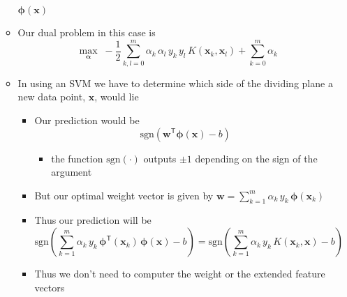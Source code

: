 \documentclass[11pt]{article}
\newcommand{\tr}{\textsf{T}}
\begin{document}
\begin{itemize}
\begin{itemize}
\(\bm{\phi}(\bm{x})\)
\item Our dual problem in this case is
$$ \max_{\bm{\alpha}}\;- \frac{1}{2} \sum_{k,l=0}^m
        \alpha_k\,\alpha_l \,
          y_k\,y_l\, K(\bm{x}_k,\bm{x}_l) +
           \sum_{k=0}^m \alpha_k$$
\item In using an SVM we have to determine which side of the dividing
plane a new data point, \(\bm{x}\), would lie
\begin{itemize}
\item Our prediction would be
$$ \mathrm{sgn}\!\left(\bm{w}^\tr \bm{\phi}(\bm{x}) -b\right) $$
\begin{itemize}
\item the function \(\mathrm{sgn}(\cdot)\) outputs \(\pm1\) depending on the
sign of the argument
\end{itemize}
\item But our optimal weight vector is given by \(\bm{w} =
         \sum\limits_{k=1}^m \alpha_k\,y_k\,\bm{\phi}(\bm{x}_k)\)
\item Thus our prediction will be
$$ \mathrm{sgn}\!\left(  \sum_{k=1}^m
         \alpha_k\,y_k\,\bm{\phi}^\tr(\bm{x}_k)\,\bm{\phi}(\bm{x})
         -b\right)  =  \mathrm{sgn}\!\left(  \sum_{k=1}^m
         \alpha_k\,y_k\,K(\bm{x}_k,\bm{x})-b\right)  $$
\item Thus we don't need to computer the weight or the extended
feature vectors
\end{itemize}
\end{itemize}
\end{itemize}
\end{document}
